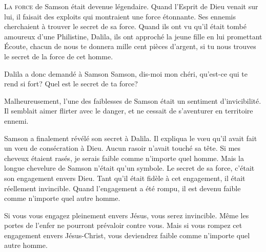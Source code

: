 \dvrule






\lettrine{L}{a force} de Samson était devenue légendaire.
 Quand l'Esprit de Dieu venait sur lui, il faisait des exploits
 qui montraient une force étonnante.
 Ses ennemis cherchaient à trouver le secret de sa force.
 Quand ils ont vu qu'il était tombé amoureux d'une Philistine, Dalila,
 ils ont approché la jeune fille en lui promettant\frcolon{}
 \Og Écoute, chacun de nous te donnera mille cent pièces d'argent,
 si tu nous trouves le secret de la force de cet homme. \Fg{}

Dalila a donc demandé à Samson\frcolon{}
 \Og Samson, dis-moi mon chéri, qu'est-ce qui te rend si fort?
 Quel est le secret de ta force? \Fg{}

Malheureusement, l'une des faiblesses de Samson était
 un sentiment d'invicibilité.
 Il semblait aimer flirter avec le danger,
 et ne cessait de s'aventurer en territoire ennemi.

Samson a finalement révélé son secret à Dalila.
 Il expliqua le v\oe{}u qu'il avait fait
 \ocadr un v\oe{}u de consécration à Dieu.
 Aucun rasoir n'avait touché sa tête.
 \Og Si mes cheveux étaient rasés,
 je serais faible comme n'importe quel homme. \Fg{}
 Mais la longue chevelure de Samson n'était qu'un symbole.
 Le secret de sa force, c'était son engagement envers Dieu.
 Tant qu'il était fidèle à cet engagement, il était réellement invincible.
 Quand l'engagement a été rompu, il est devenu faible
 comme n'importe quel autre homme.


Si vous vous engagez pleinement envers Jésus, vous serez invincible.
 Même les portes de l'enfer ne pourront prévaloir contre vous.
 Mais si vous rompez cet engagement envers Jésus-Christ,
 vous deviendrez faible comme n'importe quel autre homme. 

\dvrule

